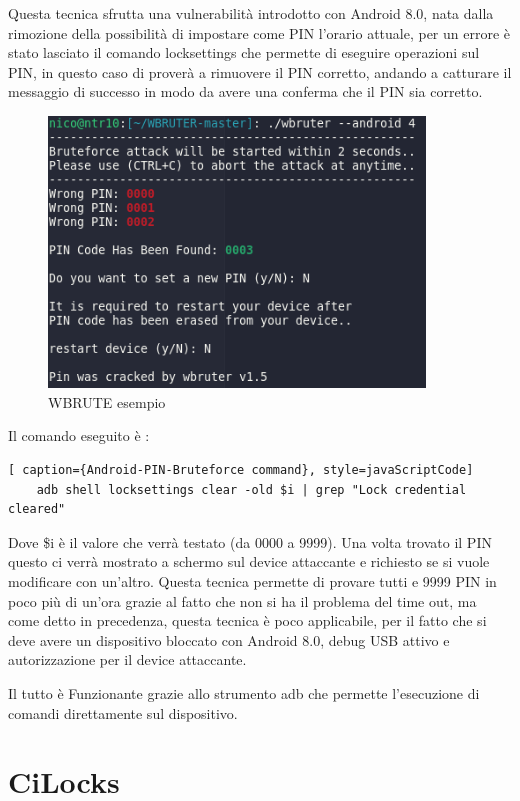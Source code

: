 Questa tecnica sfrutta una vulnerabilità introdotto con Android 8.0, nata dalla rimozione della possibilità di impostare come PIN l’orario attuale, per un errore è stato lasciato il comando locksettings che permette di eseguire operazioni sul PIN, in questo caso di proverà a rimuovere il PIN corretto, andando a catturare il messaggio di successo in modo da avere una conferma che il PIN sia corretto.

\begin{figure}[h!]
	\centering
	\includegraphics[width=100mm]{Immagini/3/wbrute.png}
	\caption{WBRUTE esempio}
    \label{fig:WBRUTE_esempio}
\end{figure}

Il comando eseguito è :

\begin{lstlisting}[ caption={Android-PIN-Bruteforce command}, style=javaScriptCode]
	adb shell locksettings clear -old $i | grep "Lock credential cleared"
\end{lstlisting}

Dove \$i è il valore che verrà testato (da 0000 a 9999). Una volta trovato il PIN questo ci verrà mostrato a schermo sul device attaccante e richiesto se si vuole modificare con un’altro. Questa tecnica permette di provare tutti e 9999 PIN in poco più di un’ora grazie al fatto che non si ha il problema del time out, ma come detto in precedenza, questa tecnica è poco applicabile, per il fatto che si deve avere un dispositivo bloccato con Android 8.0, debug USB attivo e autorizzazione per il device attaccante.

Il tutto è Funzionante grazie allo strumento adb\cite{adb} che permette l’esecuzione di comandi direttamente sul dispositivo.


\section{CiLocks}

